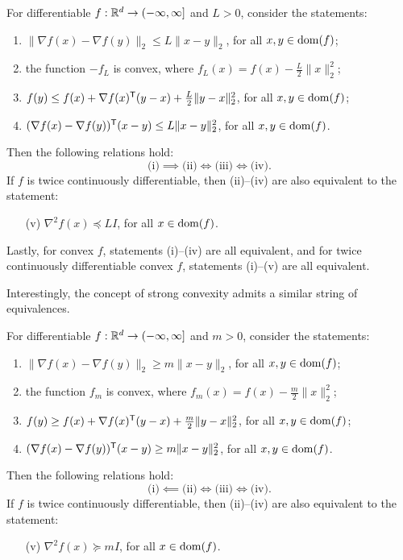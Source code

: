 \begin{Theorem}
\label{thm:lipschitz_smoothness}
For differentiable $f : \mathbb{R}^d \to (-\infty, \infty]$ and $L>0$, consider the
statements:  
\begin{enumerate}[label=(\roman*)]
\item $\|\nabla f(x) - \nabla f(y)\|_2 \leq L \|x-y\|_2$, for all $x,y \in
  \operatorname{dom}(f)$; 
\item the function $-f_L$ is convex, where $f_L(x) = f(x) - \frac{L}{2}
  \|x\|_2^2$;   
\item $f(y) \leq f(x) + \nabla f(x)^{\mathsf{T}} (y-x) + \frac{L}{2} \|y-x\|_2^2$, for all
  $x,y \in \operatorname{dom}(f)$;
\item $(\nabla f(x) - \nabla f(y))^{\mathsf{T}} (x - y) \leq L\|x-y\|_2^2$, for all $x,y
  \in \operatorname{dom}(f)$.
\end{enumerate}
Then the following relations hold: 
\[
\text{(i)} \implies \text{(ii)} \iff \text{(iii)} \iff \text{(iv)}. 
\]
If $f$ is twice continuously differentiable, then (ii)--(iv) are also equivalent
to the statement: 
\begin{enumerate}
\item[(v)] $\nabla^2 f(x) \preceq LI$, for all $x \in \operatorname{dom}(f)$.
\end{enumerate} 
Lastly, for convex $f$, statements (i)--(iv) are all equivalent, and for twice  
continuously differentiable convex $f$, statements (i)--(v) are all equivalent. 
\end{Theorem}

Interestingly, the concept of strong convexity admits a similar string of
equivalences. 

\begin{Theorem}
\label{thm:strong_convexity}
For differentiable $f : \mathbb{R}^d \to (-\infty, \infty]$ and $m>0$, consider the
statements:  
\begin{enumerate}[label=(\roman*)]
\item $\|\nabla f(x) - \nabla f(y)\|_2 \geq m \|x-y\|_2$, for all $x,y \in
  \operatorname{dom}(f)$; 
\item the function $f_m$ is convex, where $f_m(x) = f(x) - \frac{m}{2}
  \|x\|_2^2$;   
\item $f(y) \geq f(x) + \nabla f(x)^{\mathsf{T}} (y-x) + \frac{m}{2} \|y-x\|_2^2$, for all
  $x,y \in \operatorname{dom}(f)$;
\item $(\nabla f(x) - \nabla f(y))^{\mathsf{T}} (x - y) \geq m\|x-y\|_2^2$, for all $x,y
  \in \operatorname{dom}(f)$.
\end{enumerate}
Then the following relations hold: 
\[
\text{(i)} \impliedby \text{(ii)} \iff \text{(iii)} \iff \text{(iv)}. 
\]
If $f$ is twice continuously differentiable, then (ii)--(iv) are also equivalent
to the statement: 
\begin{enumerate}
\item[(v)] $\nabla^2 f(x) \succeq mI$, for all $x \in \operatorname{dom}(f)$.
\end{enumerate}
\end{Theorem}

